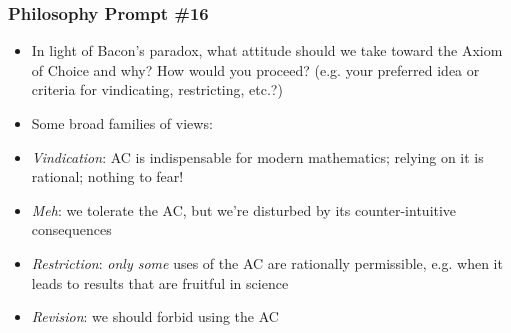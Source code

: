 \begin{frame}
\frametitle{Philosophy Prompt \#16}

\begin{itemize}[<+->]

\item In light of Bacon's paradox, what attitude should we take toward the Axiom of Choice and why? How would you proceed? (e.g. your preferred idea or criteria for vindicating, restricting, etc.?)

\medskip

\item Some broad families of views:

\bi

\item \emph{Vindication}: AC is indispensable for modern mathematics; relying on it is rational; nothing to fear! 

\item \emph{Meh}: we tolerate the AC, but we're disturbed by its counter-intuitive consequences

\item \emph{Restriction}: \textit{only some} uses of the AC are rationally permissible, e.g. when it leads to results that are fruitful in science 

\item \emph{Revision}: we should forbid using the AC

\ei


\end{itemize}
\end{frame}



\iffalse %

